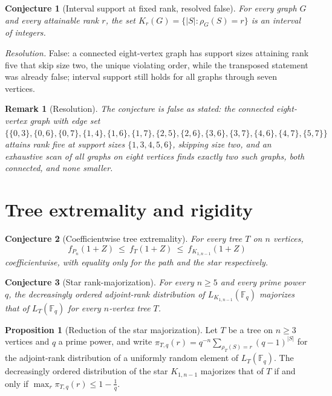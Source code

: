 \documentclass[11pt]{article}
\newtheorem{conjecture}{Conjecture}
\newtheorem{remark}{Remark}
\theoremstyle{definition}
\newcommand{\Fq}{\mathbb F}
\newtheorem{proposition}{Proposition}
\begin{document}
\begin{conjecture}[Interval support at fixed rank, resolved false]\label{u15}
For every graph $G$ and every attainable rank $r$, the set $K_r(G)=\{|S|:\rho_G(S)=r\}$ is an interval of integers.
\end{conjecture}

\emph{Resolution.} False: a connected eight-vertex graph has support sizes attaining rank five that skip size two, the unique violating order, while the transposed statement was already false; interval support still holds for all graphs through seven vertices.

\begin{remark}[Resolution]
The conjecture is false as stated: the connected eight-vertex graph with edge set $\{\{0,3\},\{0,6\},\{0,7\},\{1,4\},\{1,6\},\{1,7\},\{2,5\},\{2,6\},\{3,6\},\{3,7\},\{4,6\},\{4,7\},\{5,7\}\}$ attains rank five at support sizes $\{1,3,4,5,6\}$, skipping size two, and an exhaustive scan of all graphs on eight vertices finds exactly two such graphs, both connected, and none smaller.
\end{remark}

\section{Tree extremality and rigidity}

\begin{conjecture}[Coefficientwise tree extremality]\label{u16}
For every tree $T$ on $n$ vertices,
\[
f_{P_n}(1+Z)\ \le\ f_T(1+Z)\ \le\ f_{K_{1,n-1}}(1+Z)
\]
coefficientwise, with equality only for the path and the star respectively.
\end{conjecture}

\begin{conjecture}[Star rank-majorization]\label{u17}
For every $n\ge5$ and every prime power $q$, the decreasingly ordered adjoint-rank distribution of $L_{K_{1,n-1}}(\Fq_q)$ majorizes that of $L_T(\Fq_q)$ for every $n$-vertex tree $T$.
\end{conjecture}

\begin{proposition}[Reduction of the star majorization]\label{u:starmaj}
Let $T$ be a tree on $n\ge3$ vertices and $q$ a prime power, and write $\pi_{T,q}(r)=q^{-n}\sum_{\rho_T(S)=r}(q-1)^{|S|}$ for the adjoint-rank distribution of a uniformly random element of $L_T(\Fq_q)$.  The decreasingly ordered distribution of the star $K_{1,n-1}$ majorizes that of $T$ if and only if $\max_r\pi_{T,q}(r)\le 1-\tfrac1q$.
\end{proposition}
\end{document}
